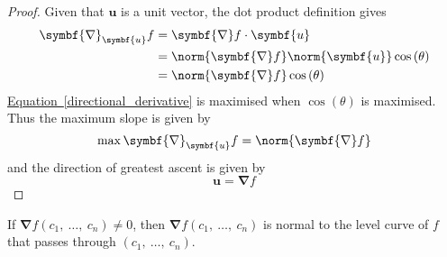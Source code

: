 \documentclass{article}
\begin{document}
\begin{proof}
    Given that \(\symbf{u}\) is a unit vector, the dot product
    definition gives
    \begin{align}
        \symbf{\nabla}_{\symbf{u}}f & = \symbf{\nabla}f \cdot \symbf{u} \nonumber                                         \\
                                    & = \norm{\symbf{\nabla}f} \norm{\symbf{u}} \cos{\left( \theta \right)} \nonumber     \\
                                    & = \norm{\symbf{\nabla}f} \cos{\left( \theta \right)} \label{directional_derivative}
    \end{align}
    \hyperref[directional_derivative]{Equation~\ref{directional_derivative}}
    is maximised when \(\cos{\left( \theta \right)}\) is maximised. Thus
    the maximum slope is given by
    \begin{equation*}
        \max \symbf{\nabla}_{\symbf{u}}f = \norm{\symbf{\nabla}f}
    \end{equation*}
    and the direction of greatest ascent is given by
    \begin{equation*}
        \symbf{u} = \symbf{\nabla}f
    \end{equation*}
\end{proof}
\begin{theorem}
    If \(\symbf{\nabla}f\left( c_1,\: \ldots,\: c_n \right) \neq 0\), then \(\symbf{\nabla}f\left( c_1,\: \ldots,\: c_n \right)\) is normal to the level
    curve of \(f\) that passes through \(\left( c_1,\: \ldots,\: c_n \right)\).
\end{theorem}
\end{document}
